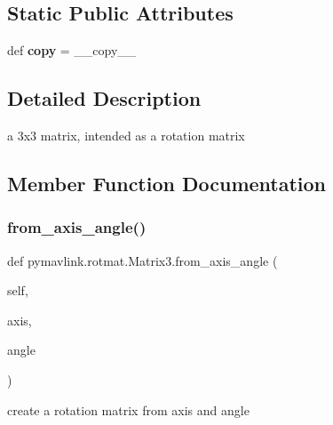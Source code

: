 \subsection*{Static Public Attributes}
\begin{DoxyCompactItemize}
\item 
\mbox{\label{classpymavlink_1_1rotmat_1_1Matrix3_a2766663f4736ceabdd5f39d98dcfef7f}} 
def {\bfseries copy} = \+\_\+\+\_\+copy\+\_\+\+\_\+
\end{DoxyCompactItemize}


\subsection{Detailed Description}
\begin{DoxyVerb}a 3x3 matrix, intended as a rotation matrix\end{DoxyVerb}
 

\subsection{Member Function Documentation}
\mbox{\label{classpymavlink_1_1rotmat_1_1Matrix3_a65a0956b9e01314396316e247ae56ed8}} 
\subsubsection{\texorpdfstring{from\+\_\+axis\+\_\+angle()}{from\_axis\_angle()}}
{\footnotesize\ttfamily def pymavlink.\+rotmat.\+Matrix3.\+from\+\_\+axis\+\_\+angle (\begin{DoxyParamCaption}\item[{}]{self,  }\item[{}]{axis,  }\item[{}]{angle }\end{DoxyParamCaption})}

\begin{DoxyVerb}create a rotation matrix from axis and angle\end{DoxyVerb}
 \mbox{\label{classpymavlink_1_1rotmat_1_1Matrix3_ab56d7d62a2e980b5528cadd6af6f273d}} 
